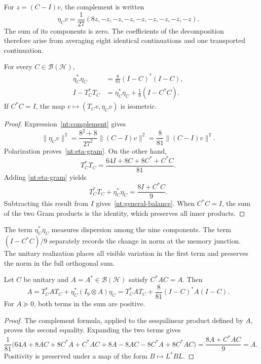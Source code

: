 For \(z=(C-I)v\), the complement is written
\begin{equation}
 \eta_Cv=\frac1{27}(8z,-z,-z,-z,-z,-z,-z,-z,-z).
 \label{nt:complement}
\end{equation}
The sum of its components is zero. The coefficients of the
decomposition therefore arise from averaging eight
identical continuations and one transported continuation.

\begin{proposition}
For every \(C\in\mathcal B(\mathcal H)\),
\begin{align}
 \eta_C^*\eta_C
   &=\frac8{81}(I-C)^*(I-C),\label{nt:eta-gram}\\
 I-T_C^*T_C
   &=\eta_C^*\eta_C+\frac19(I-C^*C).\label{nt:general-balance}
\end{align}
If \(C^*C=I\), the map
\(v\mapsto(T_Cv,\eta_Cv)\) is isometric.
\end{proposition}

\begin{proof}
Expression~\eqref{nt:complement} gives
\[
 \|\eta_Cv\|^2
 =\frac{8^2+8}{27^2}\|(C-I)v\|^2
 =\frac8{81}\|(C-I)v\|^2.
\]
Polarization proves~\eqref{nt:eta-gram}. On the other hand,
\[
 T_C^*T_C
 =\frac{64I+8C+8C^*+C^*C}{81}.
\]
Adding \eqref{nt:eta-gram} yields
\[
 T_C^*T_C+\eta_C^*\eta_C=\frac{8I+C^*C}{9}.
\]
Subtracting this result from \(I\) gives~\eqref{nt:general-balance}.
When \(C^*C=I\), the sum of the two Gram products is the
identity, which preserves all inner products.
\end{proof}

The term \(\eta_C^*\eta_C\) measures dispersion among the nine
components. The term \((I-C^*C)/9\) separately records
the change in norm at the memory junction. The unitary
realization places all visible variation in the first term and
preserves the norm in the full orthogonal sum.

\begin{proposition}
Let \(C\) be unitary and \(A=A^*\in\mathcal B(\mathcal H)\) satisfy
\(C^*AC=A\). Then
\begin{equation}
 A=T_C^*AT_C+
   \eta_C^*(I_9\otimes A)\eta_C
  =T_C^*AT_C+\frac8{81}(I-C)^*A(I-C).
 \label{nt:observable-balance}
\end{equation}
For \(A\succeq0\), both terms in the sum are positive.
\end{proposition}

\begin{proof}
The complement formula, applied to the sesquilinear product
defined by \(A\), proves the second equality. Expanding
the two terms gives
\[
 \frac1{81}\bigl(
 64A+8AC+8C^*A+C^*AC
 +8A-8AC-8C^*A+8C^*AC\bigr)
 =\frac{8A+C^*AC}{9}=A.
\]
Positivity is preserved under a map of the form
\(B\mapsto L^*BL\).
\end{proof}

